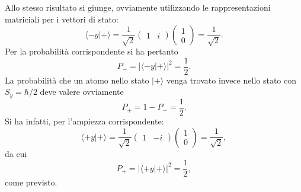 Allo stesso risultato si giunge, ovviamente utilizzando le rappresentazioni matriciali per i vettori di stato:
	\begin{equation}
		\langle -y | + \rangle= \frac{1}{\sqrt{2}}
		\begin{pmatrix}
		1 & i
		\end{pmatrix}
		\begin{pmatrix}
		1 \\
		0
		\end{pmatrix}=
		\frac{1}{\sqrt{2}} .
	\end{equation}
Per la probabilità corrispondente si ha pertanto
	\begin{equation}
		\boxed{
			P_-= |\langle -y | + \rangle |^2=\frac{1}{2} .
			}
	\end{equation}
La probabilità che un atomo nello stato $| + \rangle $  venga trovato invece nello stato con $S_y=\hbar/2$ deve valere ovviamente
	\begin{equation}
		\boxed{
			P_+= 1-P_-=\frac{1}{2} .
			}
	\end{equation}
Si ha infatti, per l'ampiezza corrispondente:
	\begin{equation}
		\langle +y | + \rangle = \frac{1}{\sqrt{2}}
		\begin{pmatrix}
		1 & -i
		\end{pmatrix}
		\begin{pmatrix}
		1 \\
		0
		\end{pmatrix}=
		\frac{1}{\sqrt{2}} ,
	\end{equation}
da cui
	\begin{equation}
		P_+= |\langle +y | + \rangle |^2=\frac{1}{2} ,
		\end{equation}
come previsto.

